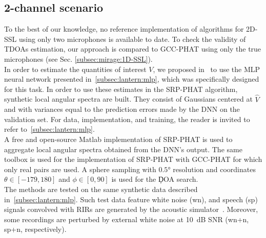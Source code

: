 \subsection{2-channel scenario}
To the best of our knowledge, no reference implementation of algorithms for 2D-SSL using only two microphones is available to date.
To check the validity of \ac{TDOA}s estimation, our approach is compared to \ac{GCC-PHAT} using only the true microphones (see Sec. \cref{subsec:mirage:1D-SSL}).
\\In order to estimate the quantities of interest $V$, we proposed in~ to use the \acf{MLP} neural network presented in~\cref{subsec:lantern:mlp}, which was specifically designed for this task.
In order to use these estimates in the \ac{SRP-PHAT} algorithm, synthetic local angular spectra are built.
They consist of Gaussians centered at $\hat{V}$ and with variances equal to the prediction errors made by the \ac{DNN} on the validation set.
For data, implementation, and training, the reader is invited to refer to~\cref{subsec:lantern:mlp}.
\\A free and open-source Matlab implementation of \ac{SRP-PHAT} is used to aggregate local angular spectra obtained from the \ac{DNN}'s output.
The same toolbox is used for the implementation of \ac{SRP-PHAT} with \ac{GCC-PHAT} for which only real pairs are used.
A sphere sampling with $\ang{0.5}$ resolution and coordinates $\theta \in [-179, 180]$ and $\phi \in [0, 90]$ is used for the \c{DOA} search.
\\The methods are tested on the same synthetic data described in~\cref{subsec:lantern:mlp}.
Such test data feature white noise (wn), and speech (sp) signals convolved with \acp{RIR} are generated by the acoustic simulator~.
Moreover, some recordings are perturbed by external white noise at 10~dB \ac{SNR} (wn+n, sp+n, respectively).

